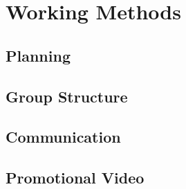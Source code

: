 \chapter{Working Methods}

\section{Planning}


\section{Group Structure}


\section{Communication}


\section{Promotional Video}


